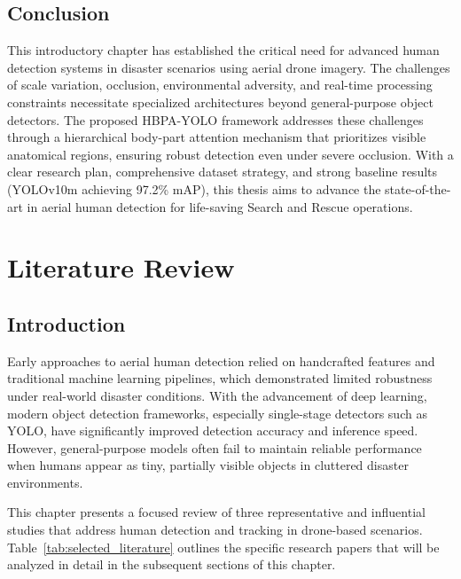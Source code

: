 \documentclass[12pt, a4paper]{report}
\begin{document}
\section{Conclusion}
This introductory chapter has established the critical need for advanced human detection systems in disaster scenarios using aerial drone imagery. The challenges of scale variation, occlusion, environmental adversity, and real-time processing constraints necessitate specialized architectures beyond general-purpose object detectors. The proposed HBPA-YOLO framework addresses these challenges through a hierarchical body-part attention mechanism that prioritizes visible anatomical regions, ensuring robust detection even under severe occlusion. With a clear research plan, comprehensive dataset strategy, and strong baseline results (YOLOv10m achieving 97.2\% mAP), this thesis aims to advance the state-of-the-art in aerial human detection for life-saving Search and Rescue operations.

\chapter{Literature Review}

\section{Introduction}
Early approaches to aerial human detection relied on handcrafted features and traditional machine learning pipelines, which demonstrated limited robustness under real-world disaster conditions. With the advancement of deep learning, modern object detection frameworks, especially single-stage detectors such as YOLO, have significantly improved detection accuracy and inference speed. However, general-purpose models often fail to maintain reliable performance when humans appear as tiny, partially visible objects in cluttered disaster environments.

This chapter presents a focused review of three representative and influential studies that address human detection and tracking in drone-based scenarios. Table~\ref{tab:selected_literature} outlines the specific research papers that will be analyzed in detail in the subsequent sections of this chapter.
\end{document}
